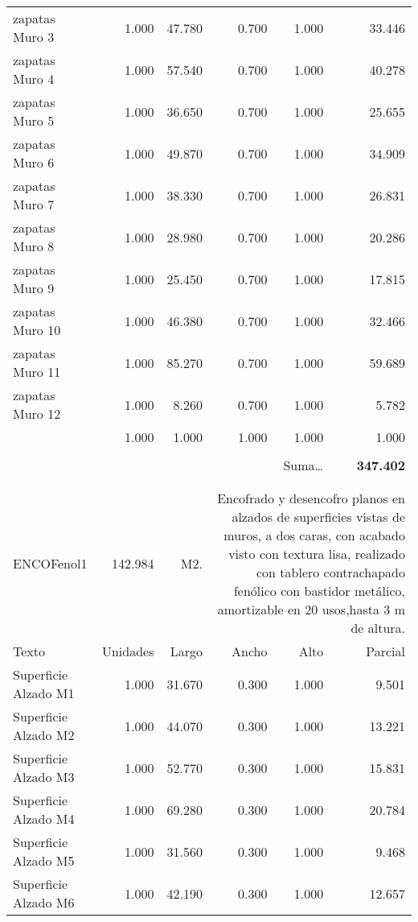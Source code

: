 \documentclass{book}%
\begin{document}
\begin{longtable}{lrrrrr}
\multicolumn{1}{p{3.5cm}}{ zapatas Muro 3 }&1.000&47.780&0.700&1.000&33.446\\%
\multicolumn{1}{p{3.5cm}}{ zapatas Muro 4}&1.000&57.540&0.700&1.000&40.278\\%
\multicolumn{1}{p{3.5cm}}{zapatas Muro 5}&1.000&36.650&0.700&1.000&25.655\\%
\multicolumn{1}{p{3.5cm}}{ zapatas Muro 6}&1.000&49.870&0.700&1.000&34.909\\%
\multicolumn{1}{p{3.5cm}}{ zapatas Muro 7}&1.000&38.330&0.700&1.000&26.831\\%
\multicolumn{1}{p{3.5cm}}{ zapatas Muro 8}&1.000&28.980&0.700&1.000&20.286\\%
\multicolumn{1}{p{3.5cm}}{ zapatas Muro 9 }&1.000&25.450&0.700&1.000&17.815\\%
\multicolumn{1}{p{3.5cm}}{zapatas Muro 10}&1.000&46.380&0.700&1.000&32.466\\%
\multicolumn{1}{p{3.5cm}}{ zapatas Muro 11}&1.000&85.270&0.700&1.000&59.689\\%
\multicolumn{1}{p{3.5cm}}{ zapatas Muro 12}&1.000&8.260&0.700&1.000&5.782\\%
\multicolumn{1}{p{3.5cm}}{}&1.000&1.000&1.000&1.000&1.000\\%
&&&&&\\%
\multicolumn{5}{r}{Suma\ldots}&\textbf{347.402}\\%
\hline%
&&&&&\\%
&&&&&\\%
ENCOFenol1&142.984& M2.&\multicolumn{3}{p{6cm}}{\scriptsize Encofrado y desencofro planos en alzados de superficies vistas de muros, a dos caras, con acabado visto con textura lisa, realizado con tablero contrachapado fenólico con bastidor metálico, amortizable en 20 usos,hasta 3 m de altura.\normalsize}\\%
Texto&Unidades&Largo&Ancho&Alto&Parcial\\%
\hline%
\multicolumn{1}{p{3.5cm}}{Superficie Alzado M1}&1.000&31.670&0.300&1.000&9.501\\%
\multicolumn{1}{p{3.5cm}}{Superficie Alzado M2}&1.000&44.070&0.300&1.000&13.221\\%
\multicolumn{1}{p{3.5cm}}{Superficie Alzado M3}&1.000&52.770&0.300&1.000&15.831\\%
\multicolumn{1}{p{3.5cm}}{Superficie Alzado M4}&1.000&69.280&0.300&1.000&20.784\\%
\multicolumn{1}{p{3.5cm}}{Superficie Alzado M5}&1.000&31.560&0.300&1.000&9.468\\%
\multicolumn{1}{p{3.5cm}}{Superficie Alzado M6}&1.000&42.190&0.300&1.000&12.657\\%

\end{longtable}
\end{document}
